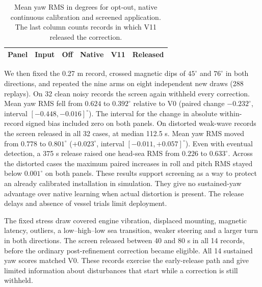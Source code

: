 \begin{table}[t]\centering\footnotesize
\caption{Mean yaw RMS in degrees for opt-out, native continuous calibration and screened application. The last column counts records in which V11 released the correction.}
\begin{tabular}{llrrrr}\toprule
Panel & Input & Off & Native & V11 & Released\\\midrule
\end{tabular}\end{table}

We then fixed the 0.27 m record, crossed magnetic dips of $45^\circ$ and $76^\circ$ in both directions, and repeated the nine arms on eight independent new draws (288 replays). On 32 clean noisy records the screen again withheld every correction. Mean yaw RMS fell from $0.624$ to $0.392^\circ$ relative to V0 (paired change $-0.232^\circ$, interval $[-0.448,-0.016]^\circ$). The interval for the change in absolute within-record signed bias included zero on both panels. On distorted weak-wave records the screen released in all 32 cases, at median 112.5 s. Mean yaw RMS moved from $0.778$ to $0.801^\circ$ ($+0.023^\circ$, interval $[-0.011,+0.057]^\circ$). Even with eventual detection, a 375 s release raised one head-sea RMS from $0.226$ to $0.633^\circ$. Across the distorted cases the maximum paired increases in roll and pitch RMS stayed below $0.001^\circ$ on both panels. These results support screening as a way to protect an already calibrated installation in simulation. They give no sustained-yaw advantage over native learning when actual distortion is present. The release delays and absence of vessel trials limit deployment.

The fixed stress draw covered engine vibration, displaced mounting, magnetic latency, outliers, a low--high--low sea transition, weaker steering and a larger turn in both directions. The screen released between 40 and 80 s in all 14 records, before the ordinary post-refinement correction became eligible. All 14 sustained yaw scores matched V0. These records exercise the early-release path and give limited information about disturbances that start while a correction is still withheld.
